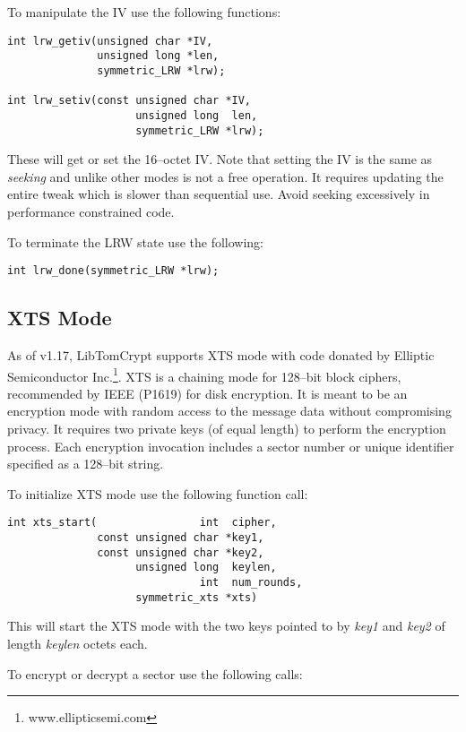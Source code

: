 \documentclass[synpaper]{book}
\begin{document}
To manipulate the IV use the following functions:

 
\begin{verbatim}
int lrw_getiv(unsigned char *IV,
              unsigned long *len,
              symmetric_LRW *lrw);

int lrw_setiv(const unsigned char *IV,
                    unsigned long  len,
                    symmetric_LRW *lrw);
\end{verbatim}
These will get or set the 16--octet IV.  Note that setting the IV is the same as \textit{seeking} and unlike other modes is not a free operation.  It requires
updating the entire tweak which is slower than sequential use.  Avoid seeking excessively in performance constrained code.

To terminate the LRW state use the following:

\begin{verbatim}
int lrw_done(symmetric_LRW *lrw);
\end{verbatim}

\subsection{XTS Mode}
As of v1.17, LibTomCrypt supports XTS mode with code donated by Elliptic Semiconductor Inc.\footnote{www.ellipticsemi.com}.
XTS is a chaining mode for 128--bit block ciphers, recommended by IEEE (P1619)
for disk encryption.  It is meant to be an encryption mode with random access to the message data without compromising privacy.  It requires two private keys (of equal
length) to perform the encryption process.  Each encryption invocation includes a sector number or unique identifier specified as a 128--bit string.

To initialize XTS mode use the following function call:

\begin{verbatim}
int xts_start(                int  cipher,
              const unsigned char *key1,
              const unsigned char *key2,
                    unsigned long  keylen,
                              int  num_rounds,
                    symmetric_xts *xts)
\end{verbatim}
This will start the XTS mode with the two keys pointed to by \textit{key1} and \textit{key2} of length \textit{keylen} octets each.

To encrypt or decrypt a sector use the following calls:
\end{document}
